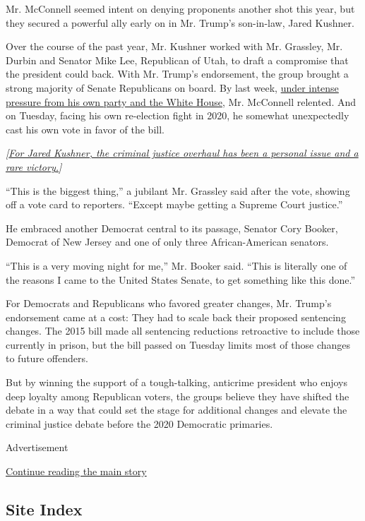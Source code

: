 Mr. McConnell seemed intent on denying proponents another shot this
year, but they secured a powerful ally early on in Mr. Trump's
son-in-law, Jared Kushner.

Over the course of the past year, Mr. Kushner worked with Mr. Grassley,
Mr. Durbin and Senator Mike Lee, Republican of Utah, to draft a
compromise that the president could back. With Mr. Trump's endorsement,
the group brought a strong majority of Senate Republicans on board. By
last week,
\href{https://www.nytimes.com/2018/12/06/us/politics/mcconnell-criminal-justice-bill.html}{under
intense pressure from his own party and the White House}, Mr. McConnell
relented. And on Tuesday, facing his own re-election fight in 2020, he
somewhat unexpectedly cast his own vote in favor of the bill.

\emph{{[}}\href{https://www.nytimes.com/2018/12/14/us/politics/jared-kushner-criminal-justice-bill.html}{\emph{For
Jared Kushner, the criminal justice overhaul has been a personal issue
and a rare victory.}}\emph{{]}}

``This is the biggest thing,'' a jubilant Mr. Grassley said after the
vote, showing off a vote card to reporters. ``Except maybe getting a
Supreme Court justice.''

He embraced another Democrat central to its passage, Senator Cory
Booker, Democrat of New Jersey and one of only three African-American
senators.

``This is a very moving night for me,'' Mr. Booker said. ``This is
literally one of the reasons I came to the United States Senate, to get
something like this done.''

For Democrats and Republicans who favored greater changes, Mr. Trump's
endorsement came at a cost: They had to scale back their proposed
sentencing changes. The 2015 bill made all sentencing reductions
retroactive to include those currently in prison, but the bill passed on
Tuesday limits most of those changes to future offenders.

But by winning the support of a tough-talking, anticrime president who
enjoys deep loyalty among Republican voters, the groups believe they
have shifted the debate in a way that could set the stage for additional
changes and elevate the criminal justice debate before the 2020
Democratic primaries.

Advertisement

\protect\hyperlink{after-bottom}{Continue reading the main story}

\hypertarget{site-index}{%
\subsection{Site Index}\label{site-index}}

